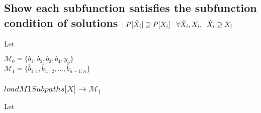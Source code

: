 \documentclass[11pt]{article}
\begin{document}
\subsection{Show each subfunction satisfies the subfunction condition of solutions $: P[\hat{X}_i] \supseteq P[X_i] \hspace{3mm} \forall \hat{X}_i,X_i, \hspace{2mm} \hat{X}_i \supseteq X_i$}
Let
\begin{center}
$
\mathcal{M}_0 = \{b_1,b_2,b_3,b_4,y_o\}
$
\\ \vspace{2mm}
$
\mathcal{M}_1 = \{\hat{b}_{1;1},\hat{b}_{1,;2},...,\hat{b}_{n-1;n}\} 
$
\end{center}

\subsubsection{$loadM1Subpaths\lbrack X\rbrack \rightarrow \mathcal{M}_1$}
Let
\end{document}

